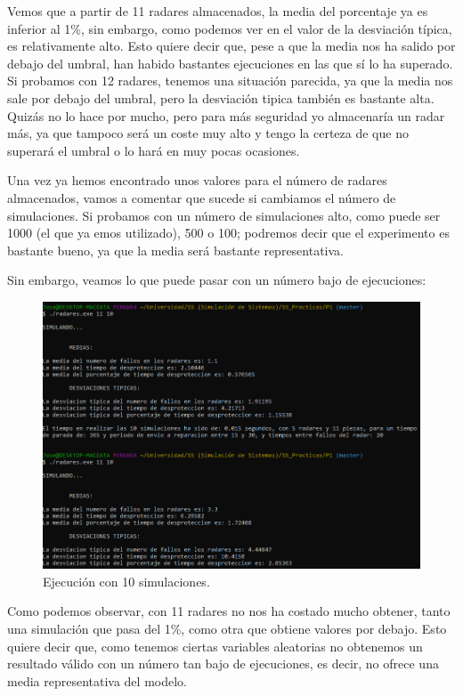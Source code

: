 \documentclass[11pt,a4paper]{report}
\begin{document}
Vemos que a partir de 11 radares almacenados, la media del porcentaje ya es inferior al 1\%, sin embargo, como podemos ver en el valor de
la desviación típica, es relativamente alto. Esto quiere decir que, pese a que la media nos ha salido por debajo del umbral, han habido
bastantes ejecuciones en las que sí lo ha superado. Si probamos con 12 radares, tenemos una situación parecida, ya que la media nos sale
por debajo del umbral, pero la desviación tipica también es bastante alta. Quizás no lo hace por mucho, pero para más seguridad yo
almacenaría un radar más, ya que tampoco será un coste muy alto y tengo la certeza de que no superará el umbral o  lo hará en muy pocas
ocasiones.

Una vez ya hemos encontrado unos valores para el número de radares almacenados, vamos a comentar que sucede si cambiamos el número
de simulaciones. Si probamos con un número de simulaciones alto, como puede ser 1000 (el que ya emos utilizado), 500 o 100; podremos
decir que el experimento es bastante bueno, ya que la media será bastante representativa.

\newpage

Sin embargo, veamos lo que puede pasar con un número bajo de ejecuciones:
\begin{figure}[H]
\centering
\includegraphics[scale=0.38]{img/sim10_radares.png}
\caption{Ejecución con 10 simulaciones.}
\end{figure}

Como podemos observar, con 11 radares no nos ha costado mucho obtener, tanto una simulación que pasa del 1\%, como otra que obtiene valores
por debajo. Esto quiere decir que, como tenemos ciertas variables aleatorias no obtenemos un resultado válido con un número tan bajo de
ejecuciones, es decir, no ofrece una media representativa del modelo.
\end{document}
